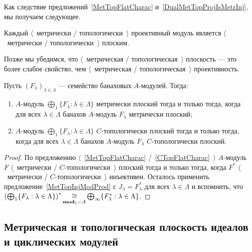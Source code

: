 Как следствие предложений~\ref{MetTopFlatCharac}
и~\ref{DualMetTopProjIsMetrInj}, мы получаем следующее.

\begin{proposition}\label{MetTopProjIsMetTopFlat} Каждый $\langle$~метрически /
топологически~$\rangle$ проективный модуль является $\langle$~метрически /
топологически~$\rangle$ плоским.
\end{proposition}

Позже мы убедимся, что $\langle$~метрическая / топологическая~$\rangle$
плоскость --- это более слабое свойство, чем $\langle$~метрическая /
топологическая~$\rangle$ проективность.

\begin{proposition}\label{MetTopFlatModCoProd} Пусть
${(F_\lambda)}_{\lambda\in\Lambda}$ --- семейство банаховых $A$-модулей. Тогда: 

\begin{enumerate}[label = (\roman*)]
    \item $A$-модуль $\bigoplus_1 \{F_\lambda:\lambda\in\Lambda \}$ метрически
    плоский тогда и только тогда, когда для всех $\lambda\in\Lambda$ банахов
    $A$-модуль $F_\lambda$ метрически плоский;
    \item $A$-модуль $\bigoplus_1 \{F_\lambda:\lambda\in\Lambda \}$
    $C$-топологически плоский тогда и только тогда, когда для всех
    $\lambda\in\Lambda$ банахов $A$-модуль $F_\lambda$ $C$-топологически
    плоский.
\end{enumerate}
\end{proposition}
\begin{proof} По предложению  $\langle$~\ref{MetTopFlatCharac}
/~\ref{CTopFlatCharac}~$\rangle$ $A$-модуль $F$ $\langle$~метрически /
$C$-топологически~$\rangle$ плоский тогда и только тогда, когда $F^*$
$\langle$~метрически / $C$-топологически~$\rangle$ инъективен. Осталось
применить предложение~\ref{MetTopInjModProd} с $J_\lambda=F_\lambda^*$ для всех
$\lambda\in\Lambda$ и вспомнить, что 
${\left(\bigoplus_1 \{
    F_\lambda:\lambda\in\Lambda \}
\right)}^*
\mathop{\mathbin{\cong}}\limits_{\mathbf{mod}_1-A}\bigoplus_\infty \{ F_\lambda^*:\lambda\in\Lambda \}$.
\end{proof}


\subsection{
    Метрическая и топологическая плоскость идеалов и циклических модулей
}\label{
    SubSectionMetricAndTopologicalFlatnessOfIdealsAndCyclicModules
}

